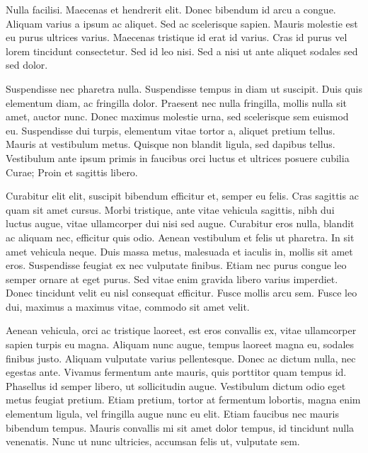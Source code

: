 \documentclass[10pt,fleqn]{article} %
\begin{document}
\begin{theorem}
Nulla facilisi. Maecenas et hendrerit elit. Donec bibendum id arcu a congue. Aliquam varius a ipsum ac aliquet. Sed ac scelerisque sapien. Mauris molestie est eu purus ultrices varius. Maecenas tristique id erat id varius. Cras id purus vel lorem tincidunt consectetur. Sed id leo nisi. Sed a nisi ut ante aliquet sodales sed sed dolor.

Suspendisse nec pharetra nulla. Suspendisse tempus in diam ut suscipit. Duis quis elementum diam, ac fringilla dolor. Praesent nec nulla fringilla, mollis nulla sit amet, auctor nunc. Donec maximus molestie urna, sed scelerisque sem euismod eu. Suspendisse dui turpis, elementum vitae tortor a, aliquet pretium tellus. Mauris at vestibulum metus. Quisque non blandit ligula, sed dapibus tellus. Vestibulum ante ipsum primis in faucibus orci luctus et ultrices posuere cubilia Curae; Proin et sagittis libero.
\end{theorem}

\begin{resultat}
Curabitur elit elit, suscipit bibendum efficitur et, semper eu felis. Cras sagittis ac quam sit amet cursus. Morbi tristique, ante vitae vehicula sagittis, nibh dui luctus augue, vitae ullamcorper dui nisi sed augue. Curabitur eros nulla, blandit ac aliquam nec, efficitur quis odio. Aenean vestibulum et felis ut pharetra. In sit amet vehicula neque. Duis massa metus, malesuada et iaculis in, mollis sit amet eros. Suspendisse feugiat ex nec vulputate finibus. Etiam nec purus congue leo semper ornare at eget purus. Sed vitae enim gravida libero varius imperdiet. Donec tincidunt velit eu nisl consequat efficitur. Fusce mollis arcu sem. Fusce leo dui, maximus a maximus vitae, commodo sit amet velit.
\end{resultat}

\begin{corollary}
Aenean vehicula, orci ac tristique laoreet, est eros convallis ex, vitae ullamcorper sapien turpis eu magna. Aliquam nunc augue, tempus laoreet magna eu, sodales finibus justo. Aliquam vulputate varius pellentesque. Donec ac dictum nulla, nec egestas ante. Vivamus fermentum ante mauris, quis porttitor quam tempus id. Phasellus id semper libero, ut sollicitudin augue. Vestibulum dictum odio eget metus feugiat pretium. Etiam pretium, tortor at fermentum lobortis, magna enim elementum ligula, vel fringilla augue nunc eu elit. Etiam faucibus nec mauris bibendum tempus. Mauris convallis mi sit amet dolor tempus, id tincidunt nulla venenatis. Nunc ut nunc ultricies, accumsan felis ut, vulputate sem.
\end{corollary}
\end{document}
